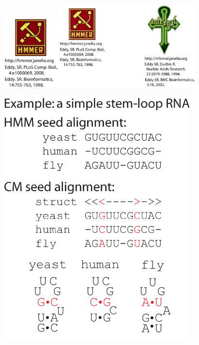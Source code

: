 \documentclass[landscape]{slides}
\begin{document}
\begin{slide}
\begin{minipage}{6in}
\hspace{2.1in}\includegraphics[height=1.5in]{figs/hmmer_logo}\hspace{0.65in}\includegraphics[height=1.8in]{figs/infernal_logo}

\normalsize
\vspace{0.1in}
\end{minipage}
\hspace{0.5in}
\begin{minipage}{4in}
\begin{center}
\includegraphics[width=4in]{figs/pm_intro_seeds}
\vspace{1.5in}
\end{center}
\end{minipage}
\vfill

\end{slide}
\end{document}
